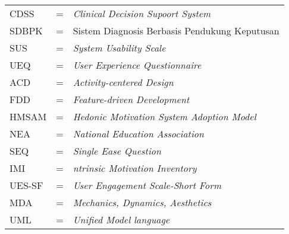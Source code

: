 \begin{center}
\end{center}

\begin{tabular}{llp{3in}}
	CDSS &  \hspace{1.5cm} = &	\textit{Clinical Decision Supoort System}\\
	SDBPK &  \hspace{1.5cm} = &	Sistem Diagnosis Berbasis Pendukung Keputusan\\
	SUS	& \hspace{1.5cm} = & \textit{System Usability Scale} \\
	UEQ & \hspace{1.5cm} = & \textit{User Experience Questionnaire }\\ 
	ACD & \hspace{1.5cm} = & \textit{Activity-centered Design} \\
	FDD & \hspace{1.5cm} = & \textit{Feature-driven Development} \\
	HMSAM & \hspace{1.5cm} = & \textit{Hedonic Motivation System Adoption Model } \\
	NEA & \hspace{1.5cm} = & \textit{National Education Association } \\
	SEQ & \hspace{1.5cm} = & \textit{Single Ease Question } \\
	IMI & \hspace{1.5cm} = & \textit{ntrinsic Motivation Inventory} \\
	UES-SF & \hspace{1.5cm} = & \textit{User Engagement Scale-Short Form} \\
	MDA & \hspace{1.5cm} = & \textit{Mechanics, Dynamics, Aesthetics} \\
	UML & \hspace{1.5cm} = & \textit{Unified Model language} \\
\end{tabular}
